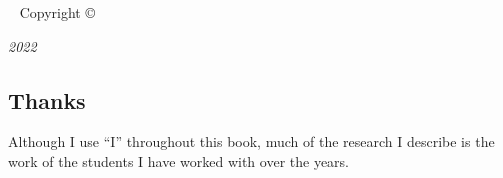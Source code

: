 \mainmatter
\maketitle


\newpage
\thispagestyle{empty}
\begingroup
  \makeatletter
  \setlength{\parindent}{0pt}
  \setlength{\parskip}{\baselineskip}
~\vfill
Copyright \copyright\ \currentyear{}\ \@author

\par\textit{2022}
  \makeatother
\endgroup

\tableofcontents





\subsection*{Thanks}

Although I use ``I'' throughout this book, much of the research I describe
is the work of the students I have worked with over the years.

